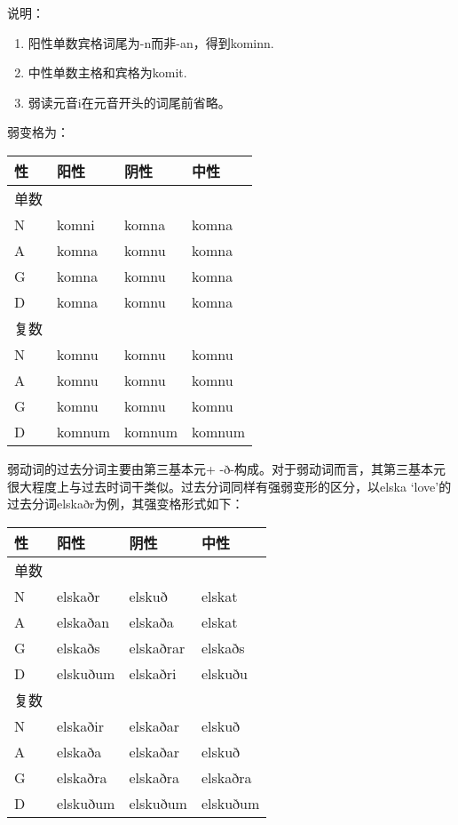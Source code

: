 说明：

\begin{enumerate}
    \item
          阳性单数宾格词尾为-n而非-an，得到kominn.
    \item
          中性单数主格和宾格为komit.
    \item
          弱读元音i在元音开头的词尾前省略。
\end{enumerate}

弱变格为：

\begin{longtable}{llll}
    \toprule
    性   & 阳性   & 阴性   & 中性   \\
    \midrule
    \endhead
    \bottomrule
    \endfoot
    单数 &        &        &        \\
    N    & komni  & komna  & komna  \\
    A    & komna  & komnu  & komna  \\
    G    & komna  & komnu  & komna  \\
    D    & komna  & komnu  & komna  \\
    复数 &        &        &        \\
    N    & komnu  & komnu  & komnu  \\
    A    & komnu  & komnu  & komnu  \\
    G    & komnu  & komnu  & komnu  \\
    D    & komnum & komnum & komnum \\
\end{longtable}

弱动词的过去分词主要由第三基本元+ -ð-构成。对于弱动词而言，其第三基本元很大程度上与过去时词干类似。过去分词同样有强弱变形的区分，以elska `love‌'的过去分词elskaðr为例，其强变格形式如下：

\begin{longtable}{llll}
    \toprule
    性   & 阳性     & 阴性      & 中性     \\
    \midrule
    \endhead
    \bottomrule
    \endfoot
    单数 &          &           &          \\
    N    & elskaðr  & elskuð    & elskat   \\
    A    & elskaðan & elskaða   & elskat   \\
    G    & elskaðs  & elskaðrar & elskaðs  \\
    D    & elskuðum & elskaðri  & elskuðu  \\
    复数 &          &           &          \\
    N    & elskaðir & elskaðar  & elskuð   \\
    A    & elskaða  & elskaðar  & elskuð   \\
    G    & elskaðra & elskaðra  & elskaðra \\
    D    & elskuðum & elskuðum  & elskuðum \\
\end{longtable}

